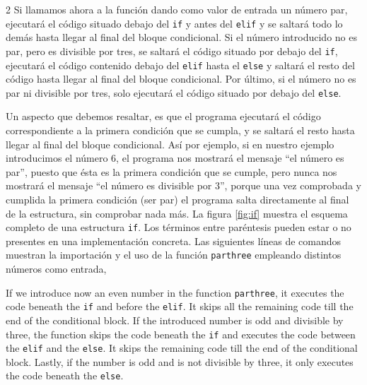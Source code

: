 \begin{paracol}{2}
Si llamamos ahora a la función dando como valor de entrada un número par, ejecutará el código situado debajo del \texttt{if} y antes del \texttt{elif} y se saltará todo lo demás hasta llegar al final del bloque condicional. Si el número introducido no es par, pero es divisible por tres, se saltará el código situado por debajo del \texttt{if}, ejecutará el código contenido debajo del  \texttt{elif} hasta el \texttt{else} y saltará el resto del código hasta llegar al final del bloque condicional. Por último, si el número no es par ni divisible por tres, solo ejecutará el código situado por debajo del \texttt{else}.

Un aspecto que debemos resaltar, es que el programa ejecutará el código correspondiente a la primera condición que se cumpla, y se saltará el resto hasta llegar al final del bloque condicional. Así por ejemplo, si en nuestro ejemplo introducimos el número $6$, el programa nos mostrará el mensaje ``el número es par'', puesto que ésta es la primera condición que se cumple, pero nunca nos mostrará el mensaje ``el número es divisible por 3'', porque una vez comprobada y cumplida la primera condición (ser par) el programa salta directamente al final de la estructura, sin comprobar nada más. La figura \ref{fig:if} muestra el esquema completo de una estructura \texttt{if}. Los términos entre paréntesis pueden estar o no presentes en una implementación concreta. Las siguientes líneas de comandos muestran la importación y el uso de la función \texttt{parthree} empleando distintos números como entrada,

\switchcolumn
If we introduce now an even number in the function \texttt{parthree}, it executes the code beneath the \texttt{if} and before the \texttt{elif}. It skips all the remaining code till the end of the conditional block. If the introduced number is odd and divisible by three, the function skips the code beneath the \texttt{if} and executes the code between the \texttt{elif} and the \texttt{else}. It skips the remaining code till the end of the conditional block. Lastly, if the number is odd and is not divisible by three, it only executes the code beneath the \texttt{else}.


\end{paracol}
